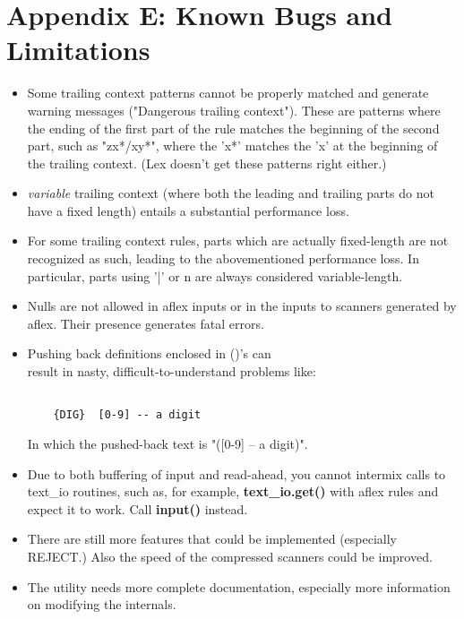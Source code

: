 \section{Appendix E: Known Bugs and Limitations}
\begin{itemize}

\item Some trailing context
patterns cannot be properly matched and generate
warning messages ("Dangerous trailing context").  These are
patterns where the ending of the
first part of the rule matches the beginning of the second
part, such as "zx*/xy*", where the 'x*' matches the 'x' at
the beginning of the trailing context.  (Lex doesn't get these
patterns right either.)

\item {\it variable}
trailing context (where both the leading and trailing parts do not have
a fixed length) entails a substantial performance loss.

\item For some trailing context rules, parts which are actually
fixed-length are not recognized as such, leading to the abovementioned
performance loss.  In particular, parts using '|' or {n} are always
considered variable-length.

\item Nulls are not allowed in aflex inputs or in the inputs to
scanners generated by aflex.  Their presence generates fatal
errors.

\item Pushing back definitions enclosed in ()'s can \\result in nasty,
difficult-to-understand problems like:
\begin{verbatim}

	{DIG}  [0-9] -- a digit

\end{verbatim}
In which the pushed-back text is "([0-9] -- a digit)".

\item Due to both buffering of input and read-ahead, you cannot intermix
calls to text\_io routines, such as, for example,
{\bf text\_io.get()}
with aflex rules and expect it to work.  Call
{\bf input()}
instead.

\item There are still more features that could be 
implemented (especially REJECT.)  Also the speed of the compressed
scanners could be improved. 

\item The utility needs more complete documentation, especially more
information on modifying the internals.
\end{itemize}

\newpage



